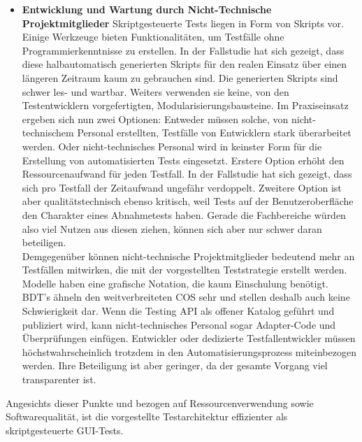 \begin{itemize}
\item \textbf{Entwicklung und Wartung durch Nicht-Technische Projektmitglieder} Skriptgesteuerte Tests liegen in Form von Skripts vor. Einige Werkzeuge bieten Funktionalitäten, um Testfälle ohne Programmierkenntnisse zu erstellen. In der Fallstudie hat sich gezeigt, dass diese halbautomatisch generierten Skripts für den realen Einsatz über einen längeren Zeitraum kaum zu gebrauchen sind. Die generierten Skripts sind schwer les- und wartbar. Weiters verwenden sie keine, von den Testentwicklern vorgefertigten, Modularisierungsbausteine. Im Praxiseinsatz ergeben sich nun zwei Optionen: Entweder müssen solche, von nicht-technischem Personal erstellten, Testfälle von Entwicklern stark überarbeitet werden. Oder nicht-technisches Personal wird in keinster Form für die Erstellung von automatisierten Tests eingesetzt. Erstere Option erhöht den Ressourcenaufwand für jeden Testfall. In der Fallstudie hat sich gezeigt, dass sich pro Testfall der Zeitaufwand ungefähr verdoppelt. Zweitere Option ist aber qualitätstechnisch ebenso kritisch, weil Tests auf der Benutzeroberfläche den Charakter eines Abnahmetests haben. Gerade die Fachbereiche würden also viel Nutzen aus diesen ziehen, können sich aber nur schwer daran beteiligen.\\
Demgegenüber können nicht-technische Projektmitglieder bedeutend mehr an Testfällen mitwirken, die mit der vorgestellten Teststrategie erstellt werden. Modelle haben eine grafische Notation, die kaum Einschulung benötigt. \Gls{BDT}'s ähneln den weitverbreiteten \Gls{COS} sehr und stellen deshalb auch keine Schwierigkeit dar. Wenn die Testing API als offener Katalog geführt und publiziert wird, kann nicht-technisches Personal sogar Adapter-Code und Überprüfungen einfügen. Entwickler oder dedizierte Testfallentwickler müssen höchstwahrscheinlich trotzdem in den Automatisierungsprozess miteinbezogen werden. Ihre Beteiligung ist aber geringer, da der gesamte Vorgang viel transparenter ist.
\end{itemize}

Angesichts dieser Punkte und bezogen auf Ressourcenverwendung sowie Softwarequalität, ist die vorgestellte Testarchitektur effizienter als skriptgesteuerte GUI-Tests.

